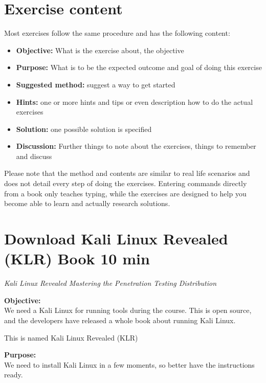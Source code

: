 \documentclass[a4paper,11pt,notitlepage]{report}
\begin{document}

\chapter*{\color{titlecolor}Exercise content}

Most exercises follow the same procedure and has the following content:
\begin{itemize}
\item {\bf Objective:} What is the exercise about, the objective
\item {\bf Purpose:} What is to be the expected outcome and goal of doing this exercise
\item {\bf Suggested method:} suggest a way to get started
\item {\bf Hints:} one or more hints and tips or even description how to
do the actual exercises
\item {\bf Solution:} one possible solution is specified
\item {\bf Discussion:} Further things to note about the exercises, things to remember and discuss
\end{itemize}

Please note that the method and contents are similar to real life scenarios and does not detail every step of doing the exercises. Entering commands directly from a book only teaches typing, while the exercises are designed to help you become able to learn and actually research solutions.


\chapter{Download Kali Linux Revealed (KLR) Book 10 min}
\label{ex:sw-downloadKLR}



\emph{Kali Linux Revealed  Mastering the Penetration Testing Distribution}


{\bf Objective:}\\
We need a Kali Linux for running tools during the course. This is open source, and the developers have released a whole book about running Kali Linux.

This is named Kali Linux Revealed (KLR)

{\bf Purpose:}\\
We need to install Kali Linux in a few moments, so better have the instructions ready.
\end{document}
